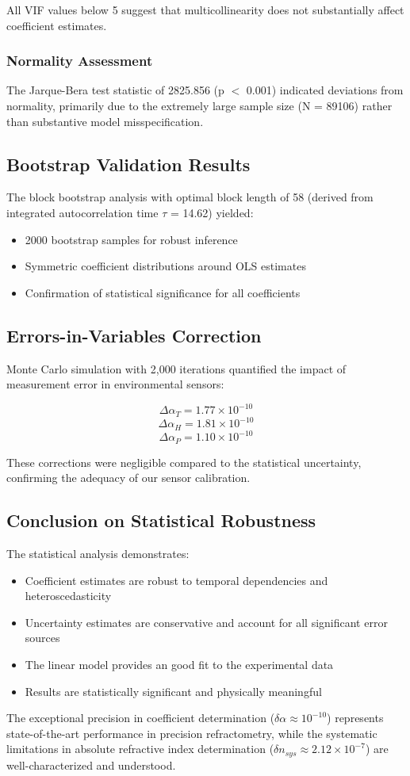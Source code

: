 \documentclass[aps,prl,reprint,groupedaddress,onecolumn,superscriptaddress]{revtex4-2}
\begin{document}
All VIF values below 5 suggest that multicollinearity does not substantially affect coefficient estimates.

\subsubsection{Normality Assessment}
The Jarque-Bera test statistic of \num{2825.856} (p $<$ 0.001) indicated deviations from normality, primarily due to the extremely large sample size (N = \num{89106}) rather than substantive model misspecification.

\subsection{Bootstrap Validation Results}
The block bootstrap analysis with optimal block length of 58 (derived from integrated autocorrelation time $\tau$ = \num{14.62}) yielded:

\begin{itemize}
    \item \num{2000} bootstrap samples for robust inference
    \item Symmetric coefficient distributions around OLS estimates
    \item Confirmation of statistical significance for all coefficients
\end{itemize}

\subsection{Errors-in-Variables Correction}
Monte Carlo simulation with 2,000 iterations quantified the impact of measurement error in environmental sensors:

$$\Delta\alpha_{T} = 1.77 \times 10^{-10}$$
$$\Delta\alpha_{H} = 1.81 \times 10^{-10}$$
$$\Delta\alpha_{P} = 1.10 \times 10^{-10}$$

These corrections were negligible compared to the statistical uncertainty, confirming the adequacy of our sensor calibration.

\subsection{Conclusion on Statistical Robustness}
The statistical analysis demonstrates:
\begin{itemize}
    \item Coefficient estimates are robust to temporal dependencies and heteroscedasticity
    \item Uncertainty estimates are conservative and account for all significant error sources
    \item The linear model provides an good fit to the experimental data
    \item Results are statistically significant and physically meaningful
\end{itemize}
The exceptional precision in coefficient determination ($\delta\alpha\approx 10^{-10}$) represents state-of-the-art performance in precision refractometry, while the systematic limitations in absolute refractive index determination ($\delta n_{sys} \approx 2.12 \times 10^{-7}$) are well-characterized and understood.


\end{document}
